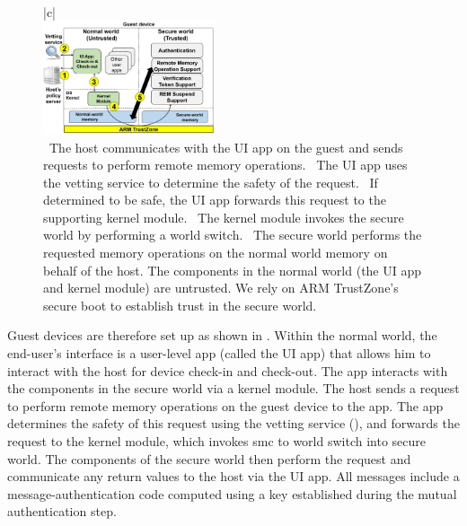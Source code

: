 \begin{figure}[t!]
\begin{center}
\begin{tabular}{|c|}
\hline
\indent\vspace{-0.3cm}\\
\includegraphics[keepaspectratio=true,width=0.45\textwidth]{figures/overall-design.png}\\
{\small \circone~The host communicates with the UI app on the guest and sends
requests to perform remote memory operations. 
%
\circtwo~The UI app uses the vetting service to determine the safety of the
request. 
%
\circthree~If determined to be safe, the UI app forwards this request to the
supporting kernel module. 
%
\circfour~The kernel module invokes the secure world by performing a world
switch. 
%
\circfive~The secure world performs the requested memory operations on the
normal world memory on behalf of the host.  The components in the normal world
(the UI app and kernel module) are untrusted. We rely on ARM TrustZone's secure
boot to establish trust in the secure world.}\\
\hline
\end{tabular}
\end{center}
\indent\vspace{-0.60cm}
\end{figure}

Guest devices are therefore set up as shown in .  Within
the normal world, the end-user's interface is a user-level app (called the UI
app) that allows him to interact with the host for device check-in and
check-out. The app interacts with the components in the secure world via a
kernel module. The host sends a request to perform remote memory operations on
the guest device to the app. The app determines the safety of this request
using the vetting service (), and forwards the request
to the kernel module, which invokes \textsf{smc} to world switch into secure
world. The components of the secure world then perform the request and
communicate any return values to the host via the UI app. All messages include
a message-authentication code computed using a key established during the
mutual authentication step.

